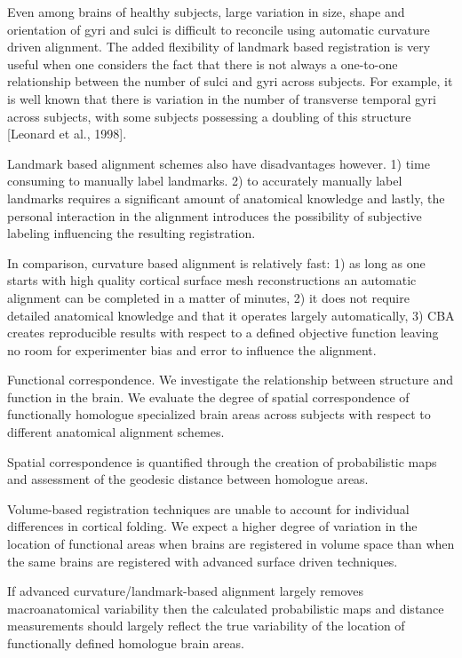 %
Even among brains of healthy subjects, large variation in size, shape and
orientation of gyri and sulci is difficult to reconcile using automatic
curvature driven alignment.
%
The added flexibility of landmark based registration is very useful when one
considers the fact that there is not always a one-to-one relationship between
the number of sulci and gyri across subjects.
%
For example, it is well known that there is variation in the number of
transverse temporal gyri across subjects, with some subjects possessing a
doubling of this structure [Leonard et al., 1998].

Landmark based alignment schemes also have disadvantages however.
%
1) time consuming to manually label landmarks.
%
2) to accurately manually label landmarks requires a significant amount of
anatomical knowledge and lastly, the personal interaction in the alignment
introduces the possibility of subjective labeling influencing the resulting
registration.

%
In comparison, curvature based alignment is relatively fast:
%
1) as long as one starts with high quality cortical surface mesh reconstructions
an automatic alignment can be completed in a matter of minutes,
%
2) it does not require detailed anatomical knowledge and that it operates
largely automatically,
%
3) CBA creates reproducible results with respect to a defined objective function
leaving no room for experimenter bias and error to influence the alignment.

Functional correspondence.
%
We investigate the relationship between structure and function in the brain.
%
We evaluate the degree of spatial correspondence of functionally homologue
specialized brain areas across subjects with respect to different anatomical
alignment schemes.

%
Spatial correspondence is quantified through the creation of probabilistic maps
and assessment of the geodesic distance between homologue areas.

%
Volume-based registration techniques are unable to account for individual
differences in cortical folding.
%
We expect a higher degree of variation in the location of functional areas when
brains are registered in volume space than when the same brains are registered
with advanced surface driven techniques.

%
If advanced curvature/landmark-based alignment largely
removes macroanatomical variability then the calculated
probabilistic maps and distance measurements should largely reflect the true
variability of the location of functionally defined homologue brain areas.

